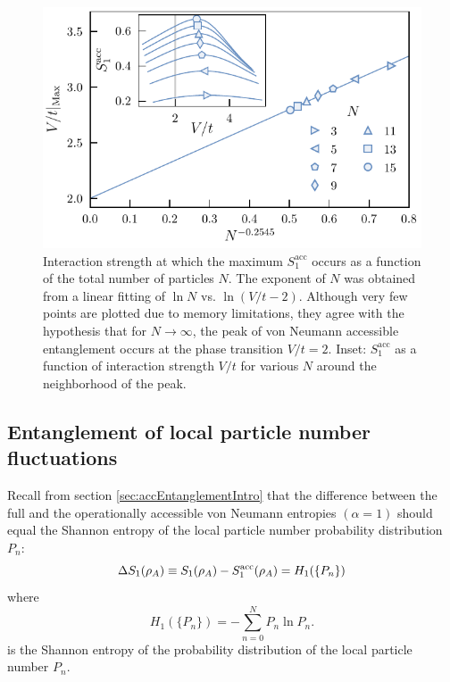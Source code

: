 \begin{figure}[h!]
\begin{center}
\includegraphics[scale=1.25]{Images/peakScalingOddN.pdf}
\end{center}
\caption{Interaction strength at which the maximum $S_{1}^{\mathrm{acc}}$ occurs as a function of the total number of particles $N$. The exponent of $N$ was obtained from a linear fitting of $\ln N$ vs. $\ln{(V/t - 2)}$.  Although very few points are plotted due to memory limitations, they agree with the hypothesis that for $N \to \infty$, the peak of von Neumann accessible entanglement occurs at the phase transition $V/t = 2$. Inset: $S_{1}^{\mathrm{acc}}$ as a function of interaction strength $V/t$ for various $N$ around the neighborhood of the peak.}
\label{fig:peakScalingOddN}
\end{figure}

\subsection{Entanglement of local particle number fluctuations}

Recall from section \ref{sec:accEntanglementIntro} that the difference between the full and the operationally accessible von Neumann entropies $\left( \alpha = 1 \right)$ should equal the Shannon entropy of the local particle number probability distribution $P_n$:
%
\begin{equation}
    \Delta S_1 (\rho_A) \equiv S_1(\rho_A) - S_1^{\rm acc}(\rho_A) = H_1(\{P_n\})
    \label{eq:DeltaS1}
\end{equation}
%
where
%
\begin{equation}
    H_1(\{P_n\}) = -\sum_{n=0}^N P_n \ln P_n.
\label{eq:H1}
\end{equation}
%
is the Shannon entropy of the probability distribution of the local particle number $P_n$.

